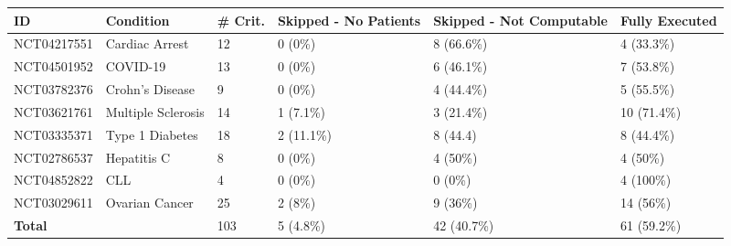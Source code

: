 \def\arraystretch{1.4}
\begin{tabular}{m{1.7cm} m{2.3cm} m{0.9cm} m{2.2cm} m{2.2cm} m{2.2cm}}
    \textbf{ID} & \textbf{Condition} & \textbf{\# Crit.} & \textbf{Skipped - \newline No Patients} & \textbf{Skipped - \newline Not Computable} & \textbf{Fully Executed} \\
    \toprule
    NCT04217551 & Cardiac Arrest     & 12 & 0 (0\%)    & 8 (66.6\%) & 4  (33.3\%) \\
    NCT04501952 & COVID-19           & 13 & 0 (0\%)    & 6 (46.1\%) & 7  (53.8\%) \\
    NCT03782376 & Crohn's Disease    & 9  & 0 (0\%)    & 4 (44.4\%) & 5  (55.5\%) \\
    NCT03621761 & Multiple Sclerosis & 14 & 1 (7.1\%)  & 3 (21.4\%) & 10 (71.4\%) \\
    NCT03335371 & Type 1 Diabetes    & 18 & 2 (11.1\%) & 8 (44.4)   & 8  (44.4\%) \\
    NCT02786537 & Hepatitis C        & 8  & 0 (0\%)    & 4 (50\%)   & 4  (50\%) \\
    NCT04852822 & CLL                & 4  & 0 (0\%)    & 0 (0\%)    & 4  (100\%) \\
    NCT03029611 & Ovarian Cancer     & 25 & 2 (8\%)    & 9 (36\%)   & 14 (56\%) \\
    \bottomrule
    \textbf{Total} & & 103 & 5 (4.8\%) & 42 (40.7\%) & 61 (59.2\%)
\end{tabular}
